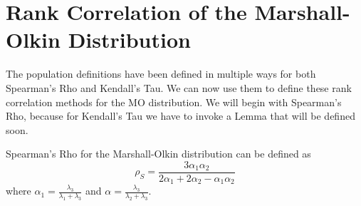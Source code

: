 \section{Rank Correlation of the Marshall-Olkin Distribution}
\hspace{24pt} The population definitions have been defined in multiple ways for both Spearman's Rho and Kendall's Tau. We can now use them to define these rank correlation methods for the MO distribution. We will begin with Spearman's Rho, because for Kendall's Tau we have to invoke a Lemma that will be defined soon.
\begin{theorem}\label{theorem:MOrho}
    Spearman's Rho for the Marshall-Olkin distribution can be defined as $$\rho_S=\frac{3\alpha_1\alpha_2}{2\alpha_1+2\alpha_2-\alpha_1\alpha_2}$$ where $\alpha_1=\frac{\lambda_3}{\lambda_1+\lambda_3}$ and $\alpha=\frac{\lambda_3}{\lambda_2+\lambda_3}$.
\end{theorem}
